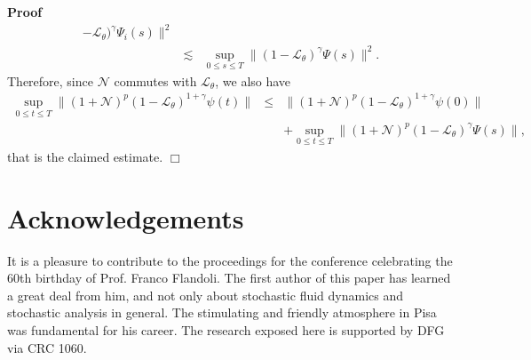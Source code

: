 \documentclass[10pt]{article}
\newenvironment{proof}{\noindent\textbf{Proof\ }}{\hspace*{\fill}$\Box$\medskip}
\begin{document}
\begin{proof}
\[\begin{array}{lll}
       -\mathcal{L}_{\theta})^{\gamma} \Psi_i (s) \|^2\\
       & \lesssim & \sup_{0 \leqslant s \leqslant T} \| (1
       -\mathcal{L}_{\theta})^{\gamma} \Psi (s) \|^2 .
     \end{array} \]
  Therefore, since $\mathcal{N}$ commutes with $\mathcal{L}_{\theta}$, we also
  have
  \begin{eqnarray*}
    \sup_{0 \leqslant t \leqslant T} \| (1 +\mathcal{N})^p (1
    -\mathcal{L}_{\theta})^{1 + \gamma} \psi (t) \| & \leqslant & \| (1
    +\mathcal{N})^p (1 -\mathcal{L}_{\theta})^{1 + \gamma} \psi (0) \|\\
    &  & + \sup_{0 \leqslant t \leqslant T} \| (1 +\mathcal{N})^p (1
    -\mathcal{L}_{\theta})^{\gamma} \Psi (s) \|,
  \end{eqnarray*}
  that is the claimed estimate.
\end{proof}

\section*{Acknowledgements}

It is a pleasure to contribute to the proceedings for the conference
celebrating the 60th birthday of Prof. Franco Flandoli. The first author of
this paper has learned a great deal from him, and not only about stochastic
fluid dynamics and stochastic analysis in general. The stimulating and
friendly atmosphere in Pisa was fundamental for his career. The research
exposed here is supported by DFG via CRC 1060.
\end{document}
